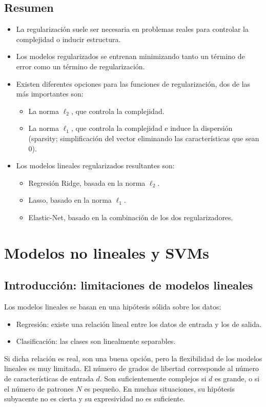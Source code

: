 \subsection{Resumen}
\begin{itemize}
\item La regularización suele ser necesaria en problemas reales para controlar la complejidad o inducir estructura.
\item Los modelos regularizados se entrenan minimizando tanto un término de error como un término de regularización.
\item Existen diferentes opciones para las funciones de regularización, dos de las más importantes son:
\begin{itemize}
\item La norma $\ell_2$, que controla la complejidad.
\item La norma $\ell_1$, que controla la complejidad e induce la dispersión (sparsity; simplificación del vector eliminando las características que sean 0).
\end{itemize}
\item Los modelos lineales regularizados resultantes son:
\begin{itemize}
\item Regresión Ridge, basada en la norma $\ell_2$.
\item Lasso, basado en la norma $\ell_1$.
\item Elastic-Net, basado en la combinación de los dos regularizadores.
\end{itemize}
\end{itemize}

\section{Modelos no lineales y SVMs}

\subsection{Introducción: limitaciones de modelos lineales}
Los modelos lineales se basan en una hipótesis sólida sobre los datos:
\begin{itemize}
\item Regresión: existe una relación lineal entre los datos de entrada y los de salida.
\item Clasificación: las clases son linealmente separables.
\end{itemize}

Si dicha relación es real, son una buena opción, pero la flexibilidad de los modelos lineales es muy limitada. El número de grados de libertad corresponde al número de características de entrada $d$. Son suficientemente complejos si $d$ es grande, o si el número de patrones $N$ es pequeño. En muchas situaciones, su hipótesis subyacente no es cierta y su expresividad no es suficiente.

